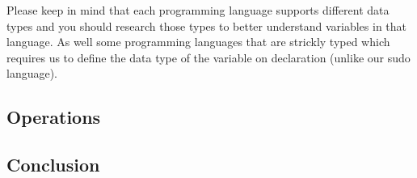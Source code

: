 Please keep in mind that each programming language supports different data types and you should research those types to better
understand variables in that language.
As well some programming languages that are strickly typed which requires us to define the data type of the
variable on declaration (unlike our sudo language).


\subsection{Operations}

\subsection{Conclusion}

